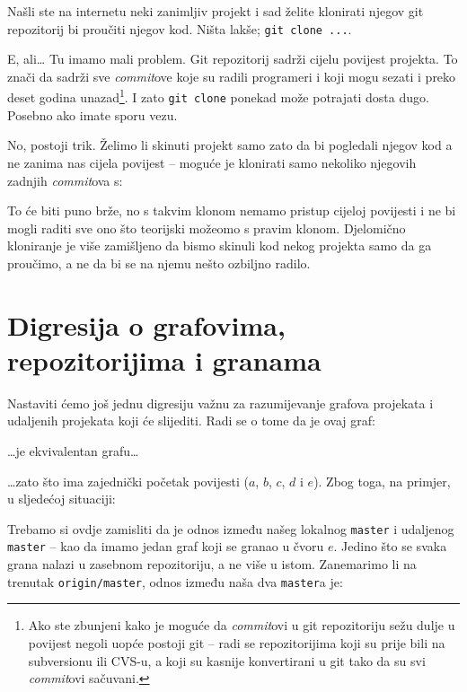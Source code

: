 Našli ste na internetu neki zanimljiv projekt i sad želite klonirati njegov git repozitorij bi proučiti njegov kod. 
Ništa lakše; \verb+git clone ...+.

E, ali\dots
Tu imamo mali problem.
Git repozitorij sadrži cijelu povijest projekta. 
To znači da sadrži sve \emph{commit}ove koje su radili programeri i koji mogu sezati i preko deset godina unazad\footnote{Ako ste zbunjeni kako je moguće da \emph{commit}ovi u git repozitoriju sežu dulje u povijest negoli uopće postoji git -- radi se repozitorijima koji su prije bili na subversionu ili CVS-u, a koji su kasnije konvertirani u git tako da su svi \emph{commit}ovi sačuvani.}.
I zato \verb+git clone+ ponekad može potrajati dosta dugo. 
Posebno ako imate sporu vezu.

No, postoji trik.
Želimo li skinuti projekt samo zato da bi pogledali njegov kod a ne zanima nas cijela povijest -- moguće je klonirati samo nekoliko njegovih zadnjih \emph{commit}ova s:


To će biti puno brže, no s takvim klonom nemamo pristup cijeloj povijesti i ne bi mogli raditi sve ono što teorijski možeomo s pravim klonom. 
Djelomično kloniranje je više zamišljeno da bismo skinuli kod nekog projekta samo da ga proučimo, a ne da bi se na njemu nešto ozbiljno radilo.

\section*{Digresija o grafovima, repozitorijima i granama}

Nastaviti ćemo još jednu digresiju važnu za razumijevanje grafova projekata i udaljenih projekata koji će slijediti.
Radi se o tome da je ovaj graf:



\dots{}je ekvivalentan grafu\dots



\dots{}zato što ima zajednički početak povijesti ($a$, $b$, $c$, $d$ i $e$).
Zbog toga, na primjer, u sljedećoj situaciji:



Trebamo si ovdje zamisliti da je odnos između našeg lokalnog \verb+master+ i udaljenog \verb+master+ -- kao da imamo jedan graf koji se granao u čvoru $e$.
Jedino što se svaka grana nalazi u zasebnom repozitoriju, a ne više u istom.
Zanemarimo li na trenutak \verb+origin/master+, odnos između naša dva \verb+master+a je:

